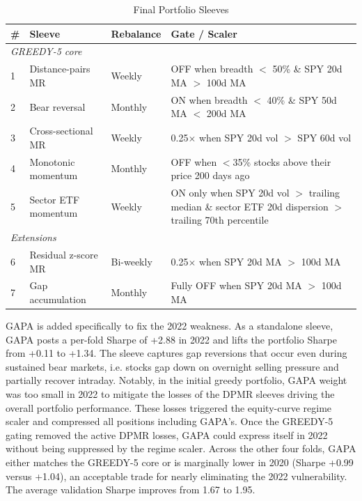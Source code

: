 \documentclass{article}
\begin{document}
\begin{table}[ht]
\centering
\caption{Final Portfolio Sleeves}
\label{tab:final_sleeves}
\begin{tabular}{lllp{8cm}}
\toprule
\textbf{\#} & \textbf{Sleeve} & \textbf{Rebalance} & \textbf{Gate / Scaler} \\
\midrule
\multicolumn{4}{l}{\textit{GREEDY-5 core}} \\
1 & Distance-pairs MR   & Weekly    & {\small OFF when breadth $<$ 50\% \& SPY 20d MA $>$ 100d MA} \\
2 & Bear reversal       & Monthly   & {\small ON when breadth $<$ 40\% \& SPY 50d MA $<$ 200d MA} \\
3 & Cross-sectional MR  & Weekly    & {\small 0.25$\times$ when SPY 20d vol $>$ SPY 60d vol} \\
4 & Monotonic momentum  & Monthly   & {\small OFF when $<$35\% stocks above their price 200 days ago} \\
5 & Sector ETF momentum & Weekly    & {\small ON only when SPY 20d vol $>$ trailing median \& sector ETF 20d dispersion $>$ trailing 70th percentile} \\
\midrule
\multicolumn{4}{l}{\textit{Extensions}} \\
6 & Residual z-score MR & Bi-weekly & {\small 0.25$\times$ when SPY 20d MA $>$ 100d MA} \\
7 & Gap accumulation    & Monthly   & {\small Fully OFF when SPY 20d MA $>$ 100d MA} \\
\bottomrule
\end{tabular}
\begin{tablenotes}
\small
\end{tablenotes}
\end{table}

GAPA is added specifically to fix the 2022 weakness. As a standalone sleeve, GAPA posts a per-fold Sharpe of +2.88 in 2022 and lifts the portfolio Sharpe from +0.11 to +1.34. The sleeve captures gap reversions that occur even during sustained bear markets, i.e. stocks gap down on overnight selling pressure and partially recover intraday. Notably, in the initial greedy portfolio, GAPA weight was too small in 2022 to mitigate the losses of the DPMR sleeves driving the overall portfolio performance. These losses triggered the equity-curve regime scaler and compressed all positions including GAPA's. Once the GREEDY-5 gating removed the active DPMR losses, GAPA could express itself in 2022 without being suppressed by the regime scaler. Across the other four folds, GAPA either matches the GREEDY-5 core or is marginally lower in 2020 (Sharpe +0.99 versus +1.04), an acceptable trade for nearly eliminating the 2022 vulnerability. The average validation Sharpe improves from 1.67 to 1.95.
\end{document}
